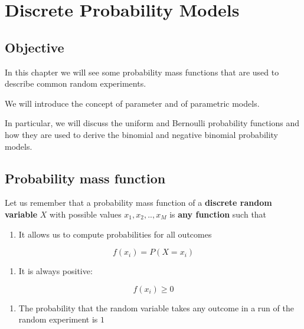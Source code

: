 \documentclass[
]{book}
\providecommand{\tightlist}{%
  \setlength{\itemsep}{0pt}\setlength{\parskip}{0pt}}
\begin{document}
\hypertarget{discrete-probability-models}{%
\chapter{Discrete Probability Models}\label{discrete-probability-models}}

\hypertarget{objective-2}{%
\section{Objective}\label{objective-2}}

In this chapter we will see some probability mass functions that are used to describe common random experiments.

We will introduce the concept of parameter and of parametric models.

In particular, we will discuss the uniform and Bernoulli probability functions and how they are used to derive the binomial and negative binomial probability models.

\hypertarget{probability-mass-function}{%
\section{Probability mass function}\label{probability-mass-function}}

Let us remember that a probability mass function of a \textbf{discrete random variable} \(X\) with possible values \(x_1 , x_2 , .. , x_M\) is \textbf{any function} such that

\begin{enumerate}
\def\labelenumi{\arabic{enumi})}
\tightlist
\item
  It allows us to compute probabilities for all outcomes
\end{enumerate}

\[f(x_i)=P(X=x_i)\]

\begin{enumerate}
\def\labelenumi{\arabic{enumi})}
\setcounter{enumi}{1}
\tightlist
\item
  It is always positive:
\end{enumerate}

\[f(x_i)\geq 0\]

\begin{enumerate}
\def\labelenumi{\arabic{enumi})}
\setcounter{enumi}{2}
\tightlist
\item
  The probability that the random variable takes any outcome in a run of the random experiment is \(1\)
\end{enumerate}
\end{document}
